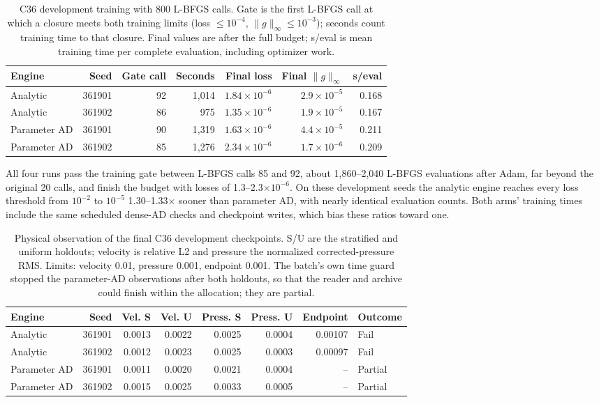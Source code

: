 \documentclass[11pt]{article}
\begin{document}
\begin{table}[htbp]\centering\small
\setlength{\tabcolsep}{4pt}
\caption{C36 development training with 800 L-BFGS calls. Gate is the first L-BFGS call at which a closure meets both training limits (loss $\le10^{-4}$, $\|g\|_\infty\le10^{-3}$); seconds count training time to that closure. Final values are after the full budget; s/eval is mean training time per complete evaluation, including optimizer work.}
\label{tab:c36v2training}
\begin{tabular}{lrrrrrr}\toprule
Engine & Seed & Gate call & Seconds & Final loss & Final $\|g\|_\infty$ & s/eval\\\midrule
Analytic & 361901 & 92 & 1,014 & $1.84\times10^{-6}$ & $2.9\times10^{-5}$ & 0.168\\
Analytic & 361902 & 86 & 975 & $1.35\times10^{-6}$ & $1.9\times10^{-5}$ & 0.167\\
Parameter AD & 361901 & 90 & 1,319 & $1.63\times10^{-6}$ & $4.4\times10^{-5}$ & 0.211\\
Parameter AD & 361902 & 85 & 1,276 & $2.34\times10^{-6}$ & $1.7\times10^{-6}$ & 0.209
\\\bottomrule\end{tabular}
\end{table}

All four runs pass the training gate between L-BFGS calls 85 and 92, about
1,860--2,040 L-BFGS evaluations after Adam, far beyond the original 20 calls,
and finish the budget with losses of 1.3--2.3$\times10^{-6}$. On these
development seeds the analytic engine reaches every loss threshold from
$10^{-2}$ to $10^{-5}$ 1.30--1.33$\times$ sooner than parameter AD, with
nearly identical evaluation counts. Both arms' training times include the
same scheduled dense-AD checks and checkpoint writes, which bias these
ratios toward one.

\begin{table}[htbp]\centering\small
\setlength{\tabcolsep}{4pt}
\caption{Physical observation of the final C36 development checkpoints. S/U are the stratified and uniform holdouts; velocity is relative L2 and pressure the normalized corrected-pressure RMS. Limits: velocity 0.01, pressure 0.001, endpoint 0.001. The batch's own time guard stopped the parameter-AD observations after both holdouts, so that the reader and archive could finish within the allocation; they are partial.}
\label{tab:c36v2physical}
\begin{tabular}{lrrrrrrl}\toprule
Engine & Seed & Vel. S & Vel. U & Press. S & Press. U & Endpoint & Outcome\\\midrule
Analytic & 361901 & 0.0013 & 0.0022 & 0.0025 & 0.0004 & 0.00107 & Fail\\
Analytic & 361902 & 0.0012 & 0.0023 & 0.0025 & 0.0003 & 0.00097 & Fail\\
Parameter AD & 361901 & 0.0011 & 0.0020 & 0.0021 & 0.0004 & -- & Partial\\
Parameter AD & 361902 & 0.0015 & 0.0025 & 0.0033 & 0.0005 & -- & Partial
\\\bottomrule\end{tabular}
\end{table}
\end{document}
